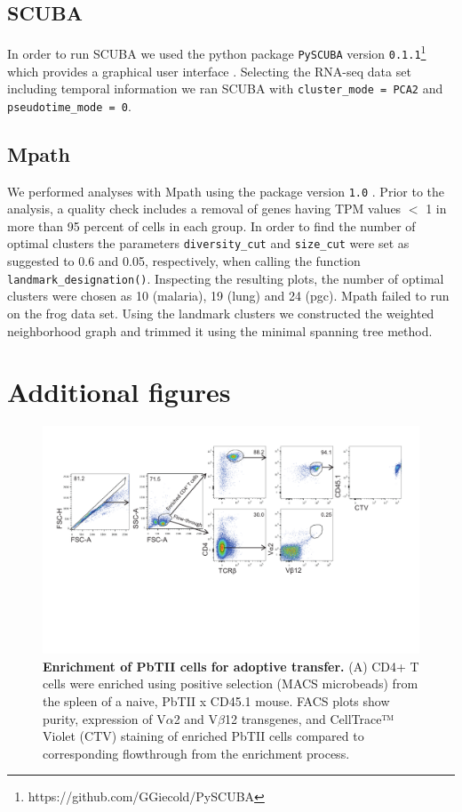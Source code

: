 \subsection{SCUBA}

In order to run SCUBA we used the python package \texttt{PySCUBA} version  \texttt{0.1.1}\footnote{https://github.com/GGiecold/PySCUBA} which provides a graphical user interface \cite{Marco2014-rf}. Selecting the RNA-seq data set including temporal information we ran SCUBA with  \texttt{cluster\_mode = PCA2} and \texttt{pseudotime\_mode = 0}.

\subsection{Mpath}

We performed analyses with Mpath using the package version \texttt{1.0} \cite{Chen2016-ar}. Prior to the analysis, a quality check includes a removal of genes having TPM values $ < $ 1 in more than 95 percent of cells in each group. In order to find the number of optimal clusters the parameters \texttt{diversity\_cut} and \texttt{size\_cut} were set as suggested to 0.6 and 0.05, respectively, when calling the function \texttt{landmark\_designation()}. Inspecting the resulting plots, the number of optimal clusters were chosen as 10 (malaria), 19 (lung) and 24 (pgc). Mpath failed to run on the frog data set. Using the landmark clusters we constructed the weighted neighborhood graph and trimmed it using the minimal spanning tree method. 

\section{Additional figures}

\begin{figure}
    \centering
    \includegraphics[width=\textwidth]{"Fig S1 rev3"}
    \caption[Enrichment of PbTII cells for adoptive transfer]{\textbf{Enrichment of PbTII cells for adoptive transfer.} (A) CD4+ T cells were enriched using positive selection (MACS microbeads) from the spleen of a naive, PbTII x CD45.1 mouse. FACS plots show purity, expression of V\( \alpha \)2 and V\( \beta \)12 transgenes, and CellTrace™ Violet (CTV) staining of enriched PbTII cells compared to corresponding flowthrough from the enrichment process.}
    \label{fig:ms1}
\end{figure}

